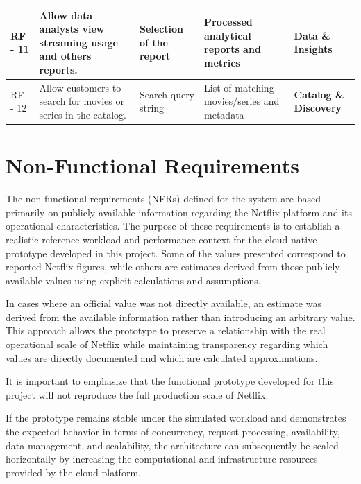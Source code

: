 \documentclass{article}
\begin{document}
\begin{longtable}{|p{1.3cm}|p{5.2cm}|p{3.2cm}|p{3.2cm}|p{3.0cm}|}

\rowcolor{pastelData}
RF - 11 &
Allow data analysts view streaming usage and others reports. &
Selection of the report &
Processed analytical reports and metrics &
\textbf{Data \& Insights} \\
\hline



\rowcolor{pastelCat}
RF - 12 &
Allow customers to search for movies or series in the catalog. &
Search query string &
List of matching movies/series and metadata &
\textbf{Catalog \& Discovery} \\
\hline

\end{longtable}


\section{Non-Functional Requirements}
The non-functional requirements (NFRs) defined for the system are based primarily on publicly available information regarding the Netflix platform and its operational characteristics. The purpose of these requirements is to establish a realistic reference workload and performance context for the cloud-native prototype developed in this project. Some of the values presented correspond to reported Netflix figures, while others are estimates derived from those publicly available values using explicit calculations and assumptions. 

In cases where an official value was not directly available, an estimate was derived from the available information rather than introducing an arbitrary value. This approach allows the prototype to preserve a relationship with the real operational scale of Netflix while maintaining transparency regarding which values are directly documented and which are calculated approximations. 

It is important to emphasize that the functional prototype developed for this project will not reproduce the full production scale of Netflix.  

If the prototype remains stable under the simulated workload and demonstrates the expected behavior in terms of concurrency, request processing, availability, data management, and scalability, the architecture can subsequently be scaled horizontally by increasing the computational and infrastructure resources provided by the cloud platform. 
\end{document}
